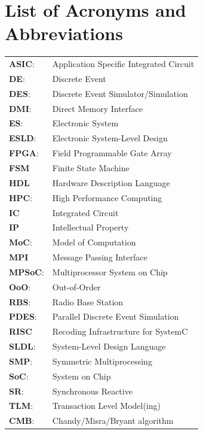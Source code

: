 \documentclass[11pt]{article}
\begin{document}
\setcounter{tocdepth}{3}
\tableofcontents
{}
\clearpage

\section*{List of Acronyms and Abbreviations}
\label{sec:org5be6d23}
\begin{tabular}{ll}
\textbf{ASIC}: & Application Specific Integrated Circuit\\
\textbf{DE}: & Discrete Event\\
\textbf{DES}: & Discrete Event Simulator/Simulation\\
\textbf{DMI}: & Direct Memory Interface\\
\textbf{ES}: & Electronic System\\
\textbf{ESLD}: & Electronic System-Level Design\\
\textbf{FPGA}: & Field Programmable Gate Array\\
\textbf{FSM} & Finite State Machine\\
\textbf{HDL} & Hardware Description Language\\
\textbf{HPC}: & High Performance Computing\\
\textbf{IC} & Integrated Circuit\\
\textbf{IP} & Intellectual Property\\
\textbf{MoC}: & Model of Computation\\
\textbf{MPI} & Message Passing Interface\\
\textbf{MPSoC}: & Multiprocessor System on Chip\\
\textbf{OoO}: & Out-of-Order\\
\textbf{RBS}: & Radio Base Station\\
\textbf{PDES}: & Parallel Discrete Event Simulation\\
\textbf{RISC} & Recoding Infrastructure for SystemC\\
\textbf{SLDL}: & System-Level Design Language\\
\textbf{SMP}: & Symmetric Multiprocessing\\
\textbf{SoC}: & System on Chip\\
\textbf{SR}: & Synchronous Reactive\\
\textbf{TLM}: & Transaction Level Model(ing)\\
\textbf{CMB}: & Chandy/Misra/Bryant algorithm\\
\end{tabular}
\clearpage
\end{document}
